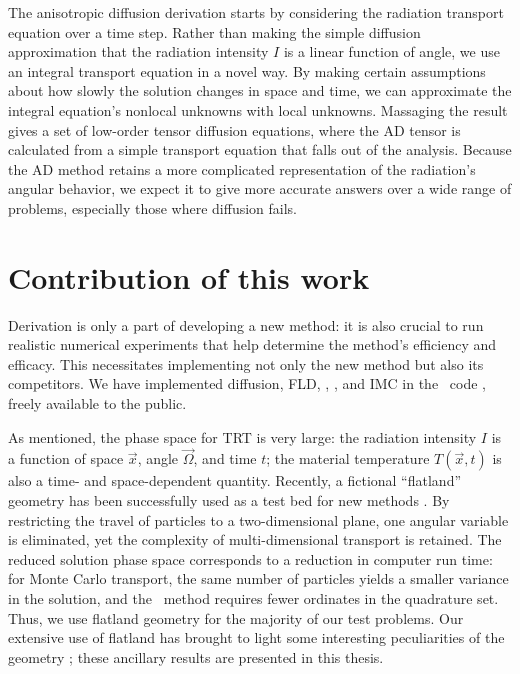 The anisotropic diffusion derivation starts by considering the radiation
transport equation over a time step. Rather than
making the simple diffusion approximation that the radiation intensity $I$ is a
linear function of angle, we use an integral transport equation in a novel way.
By making certain assumptions about how slowly the solution changes in space
and time, we can approximate the integral equation's nonlocal unknowns
with local unknowns. Massaging the result gives a set of low-order tensor
diffusion equations, where the AD tensor is calculated from a simple transport
equation that falls out of the analysis. Because the AD method retains a more
complicated representation of the radiation's angular behavior, we expect it
to give more accurate answers over a wide range of problems, especially those
where diffusion fails.


\section{Contribution of this work}

Derivation is only a part of developing a new method: it is also
crucial to run realistic numerical experiments that help determine the method's
efficiency and efficacy. This necessitates implementing not only the new method
but also its competitors. We have implemented
diffusion, FLD, \Pone, \SN, and IMC in the \pytrt\ code \cite{Pytrt}, freely
available to the public.

As mentioned, the phase space for TRT is very large: the radiation intensity
$I$ is a function of space $\vec{x}$, angle $\vec{\Omega}$, and time $t$;
the material temperature $T(\vec{x},t)$ is also a time- and space-dependent
quantity. Recently, a fictional ``flatland'' geometry has been successfully
used as a test
bed for new methods \cite{Lar2009c,Joh2011,Tra2011}. By restricting the travel
of particles to a two-dimensional plane, one angular variable is eliminated,
yet the complexity of multi-dimensional transport is retained. The
reduced solution phase space corresponds to a reduction in computer run time:
for Monte Carlo transport, the same number of particles yields a smaller
variance in the solution, and the \SN\ method requires fewer ordinates in the
quadrature set. Thus, we use flatland geometry for the majority of our test
problems.
Our extensive use of flatland has brought to light some
interesting peculiarities of the geometry \cite{Joh2011a}; these ancillary
results are presented in this thesis.

